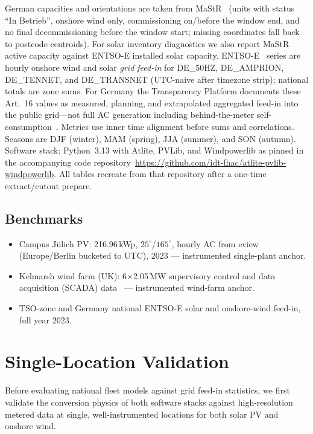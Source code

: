 \documentclass[preprint,12pt,number]{elsarticle}
\begin{document}
German capacities and orientations are taken from MaStR~\citep{MaStR,Maurer2024} (units with status ``In Betrieb'', onshore wind only, commissioning on/before the window end, and no final decommissioning before the window start; missing coordinates fall back to postcode centroids).
For solar inventory diagnostics we also report MaStR active capacity against ENTSO-E installed solar capacity.
ENTSO-E~\citep{ENTSOE} series are hourly onshore wind and solar \emph{grid feed-in} for DE\_50HZ, DE\_AMPRION, DE\_TENNET, and DE\_TRANSNET (UTC-naive after timezone strip); national totals are zone sums.
For Germany the Transparency Platform documents these Art.~16 values as measured, planning, and extrapolated aggregated feed-in into the public grid---not full AC generation including behind-the-meter self-consumption~\citep{ENTSOEActualGeneration}.
Metrics use inner time alignment before sums and correlations.
Seasons are DJF (winter), MAM (spring), JJA (summer), and SON (autumn).
Software stack: Python~3.13 with Atlite, PVLib, and Windpowerlib as pinned in the accompanying code repository~\url{https://github.com/idt-fhac/atlite-pvlib-windpowerlib}.
All tables recreate from that repository after a one-time extract/cutout prepare.

\subsection{Benchmarks}
\begin{itemize}
    \item Campus Jülich PV: 216.96\,kWp, $25^\circ$/$165^\circ$, hourly AC from eview~\citep{eviewJuelich} (Europe/Berlin bucketed to UTC), 2023 --- instrumented single-plant anchor.
    \item Kelmarsh wind farm (UK): 6$\times$2.05\,MW supervisory control and data acquisition (SCADA) data~\citep{KelmarshSCADA} --- instrumented wind-farm anchor.
    \item TSO-zone and Germany national ENTSO-E solar and onshore-wind feed-in, full year 2023.
\end{itemize}

\section{Single-Location Validation}
\label{sec:single}

Before evaluating national fleet models against grid feed-in statistics, we first validate the conversion physics of both software stacks against high-resolution metered data at single, well-instrumented locations for both solar PV and onshore wind.
\end{document}
